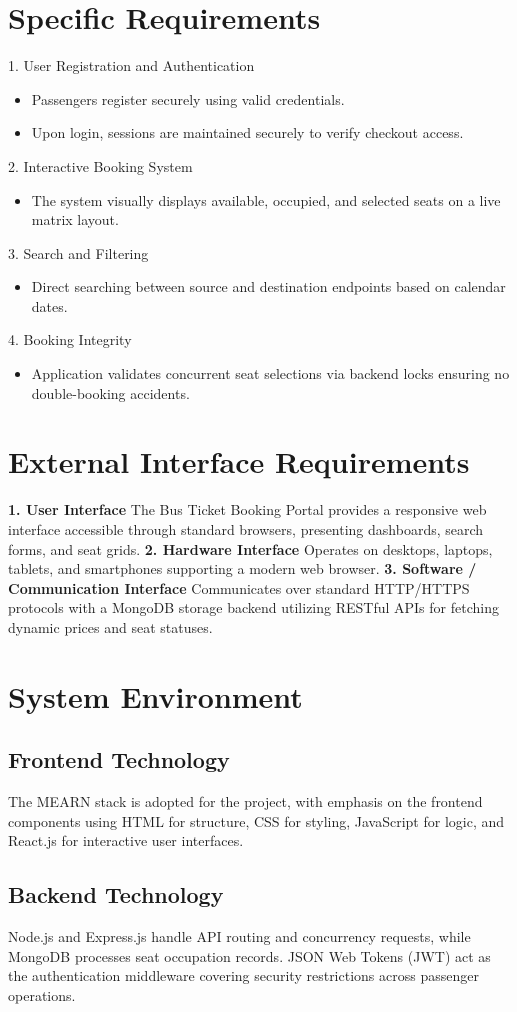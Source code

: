 \section{Specific Requirements}
1. User Registration and Authentication
\begin{itemize}
    \item Passengers register securely using valid credentials.
    \item Upon login, sessions are maintained securely to verify checkout access.
\end{itemize}
2. Interactive Booking System
\begin{itemize}
    \item The system visually displays available, occupied, and selected seats on a live matrix layout.
\end{itemize}
3. Search and Filtering
\begin{itemize}
    \item Direct searching between source and destination endpoints based on calendar dates.
\end{itemize}
4. Booking Integrity
\begin{itemize}
    \item Application validates concurrent seat selections via backend locks ensuring no double-booking accidents.
\end{itemize}

\section{External Interface Requirements}
\textbf{1. User Interface}
The Bus Ticket Booking Portal provides a responsive web interface accessible through standard browsers, presenting dashboards, search forms, and seat grids. 
\textbf{2. Hardware Interface}
Operates on desktops, laptops, tablets, and smartphones supporting a modern web browser.
\textbf{3. Software / Communication Interface}
Communicates over standard HTTP/HTTPS protocols with a MongoDB storage backend utilizing RESTful APIs for fetching dynamic prices and seat statuses.

\section{System Environment}
\subsection{Frontend Technology}
The MEARN stack is adopted for the project, with emphasis on the frontend components using HTML for structure, CSS for styling, JavaScript for logic, and React.js for interactive user interfaces.
\subsection{Backend Technology}
Node.js and Express.js handle API routing and concurrency requests, while MongoDB processes seat occupation records. JSON Web Tokens (JWT) act as the authentication middleware covering security restrictions across passenger operations.
